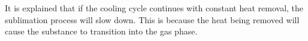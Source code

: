 It is explained that if the cooling cycle continues with constant heat removal, the sublimation process will slow down. This is because the heat being removed will cause the substance to transition into the gas phase.